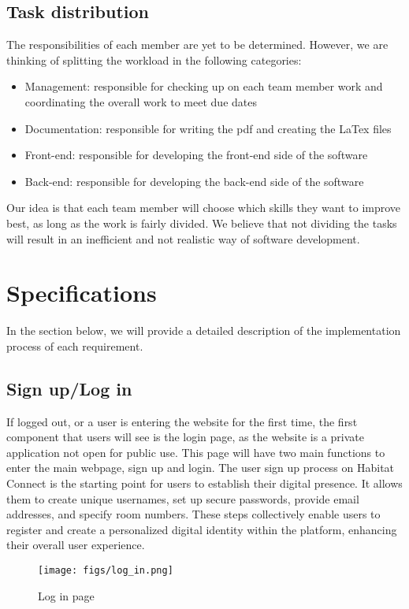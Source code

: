 \documentclass[conference]{IEEEtran}
\begin{document}
\subsection{Task distribution}
The responsibilities of each member are yet to be determined. However, we are thinking of splitting the workload in the following categories:
\begin{itemize}
    \item Management: responsible for checking up on each team member work and coordinating the overall work to meet due dates
    \item Documentation: responsible for writing the pdf and creating the LaTex files
    \item Front-end: responsible for developing the front-end side of the software
    \item Back-end: responsible for developing the back-end side of the software
\end{itemize}
Our idea is that each team member will choose which skills they want to improve best, as long as the work is fairly divided. We believe that not dividing the tasks will result in an inefficient and not realistic way of software development.


\section{Specifications}
In the section below, we will provide a detailed description of the implementation process of each requirement.


\subsection{Sign up/Log in}
If logged out, or a user is entering the website for the first time, the first component that users will see is the login page, as the website is a private application not open for public use. This page will have two main functions to enter the main webpage, sign up and login. The user sign up process on Habitat Connect is the starting point for users to establish their digital presence. It allows them to create unique usernames, set up secure passwords, provide email addresses, and specify room numbers. These steps collectively enable users to register and create a personalized digital identity within the platform, enhancing their overall user experience.
    \begin{figure}[H]
    \centering
    \texttt{[image: figs/log\_in.png]}
    \caption{Log in page}
    \label{fig:Log in page}
    \end{figure}
    
\end{document}
